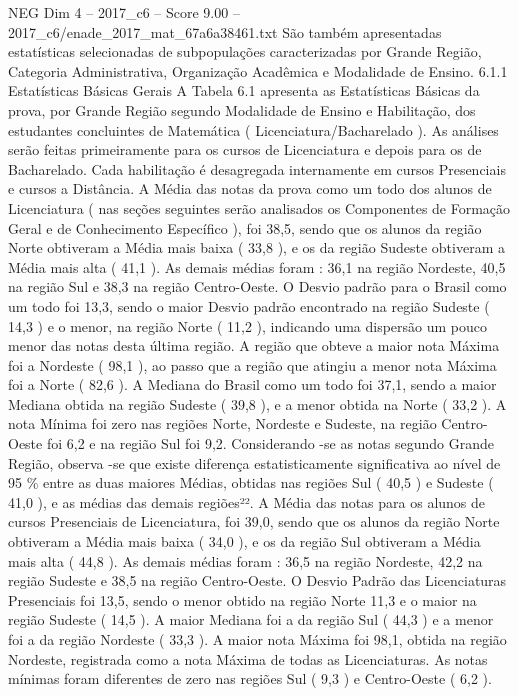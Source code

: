 \begin{textsample}{NEG Dim 4 – 2017\_c6 – Score 9.00 – 2017\_c6/enade\_2017\_mat\_67a6a38461.txt}
São também apresentadas estatísticas selecionadas de subpopulações caracterizadas por Grande Região, Categoria Administrativa, Organização Acadêmica e Modalidade de Ensino. 6.1.1 Estatísticas Básicas Gerais A Tabela 6.1 apresenta as Estatísticas Básicas da prova, por Grande Região segundo Modalidade de Ensino e Habilitação, dos estudantes concluintes de Matemática ( Licenciatura/Bacharelado ).
As análises serão feitas primeiramente para os cursos de Licenciatura e depois para os de Bacharelado.
Cada habilitação é desagregada internamente em cursos Presenciais e cursos a Distância.
A Média das notas da prova como um todo dos alunos de Licenciatura ( nas seções seguintes serão analisados os Componentes de Formação Geral e de Conhecimento Específico ), foi 38,5, sendo que os alunos da região Norte obtiveram a Média mais baixa ( 33,8 ), e os da região Sudeste obtiveram a Média mais alta ( 41,1 ).
As demais médias foram : 36,1 na região Nordeste, 40,5 na região Sul e 38,3 na região Centro-Oeste.
O Desvio padrão para o Brasil como um todo foi 13,3, sendo o maior Desvio padrão encontrado na região Sudeste ( 14,3 ) e o menor, na região Norte ( 11,2 ), indicando uma dispersão um pouco menor das notas desta última região.
A região que obteve a maior nota Máxima foi a Nordeste ( 98,1 ), ao passo que a região que atingiu a menor nota Máxima foi a Norte ( 82,6 ).
A Mediana do Brasil como um todo foi 37,1, sendo a maior Mediana obtida na região Sudeste ( 39,8 ), e a menor obtida na Norte ( 33,2 ).
A nota Mínima foi zero nas regiões Norte, Nordeste e Sudeste, na região Centro-Oeste foi 6,2 e na região Sul foi 9,2.
Considerando -se as notas segundo Grande Região, observa -se que existe diferença estatisticamente significativa ao nível de 95 \% entre as duas maiores Médias, obtidas nas regiões Sul ( 40,5 ) e Sudeste ( 41,0 ), e as médias das demais regiões²².
A Média das notas para os alunos de cursos Presenciais de Licenciatura, foi 39,0, sendo que os alunos da região Norte obtiveram a Média mais baixa ( 34,0 ), e os da região Sul obtiveram a Média mais alta ( 44,8 ).
As demais médias foram : 36,5 na região Nordeste, 42,2 na região Sudeste e 38,5 na região Centro-Oeste.
O Desvio Padrão das Licenciaturas Presenciais foi 13,5, sendo o menor obtido na região Norte 11,3 e o maior na região Sudeste ( 14,5 ).
A maior Mediana foi a da região Sul ( 44,3 ) e a menor foi a da região Nordeste ( 33,3 ).
A maior nota Máxima foi 98,1, obtida na região Nordeste, registrada como a nota Máxima de todas as Licenciaturas.
As notas mínimas foram diferentes de zero nas regiões Sul ( 9,3 ) e Centro-Oeste ( 6,2 ).

\end{textsample}
